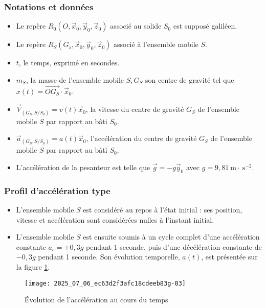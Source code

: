 \subsubsection*{Notations et données}
\begin{itemize}
  \item Le repère $R_{0}\left(O, \vec{x}_{0}, \vec{y}_{0}, \vec{z}_{0}\right)$ associé au solide $S_{0}$ est supposé galiléen.
  \item Le repère $R_{S}\left(G_{s}, \vec{x}_{0}, \vec{y}_{0}, \vec{z}_{0}\right)$ associé à l'ensemble mobile $S$.
  \item $t$, le temps, exprimé en secondes.
  \item $m_{S}$, la masse de l'ensemble mobile $S, G_{S}$ son centre de gravité tel que $x(t)=\overrightarrow{O G_{S}} \cdot \vec{x}_{0}$.
  \item $\vec{V}_{\left(G_{S}, S / S_{0}\right)}=v(t) \vec{x}_{0}$, la vitesse du centre de gravité $G_{S}$ de l'ensemble mobile $S$ par rapport au bâti $S_{0}$.
  \item $\vec{a}_{\left(G_{S}, S / S_{0}\right)}=a(t) \vec{x}_{0}$, l'accélération du centre de gravité $G_{S}$ de l'ensemble mobile $S$ par rapport au bâti $S_{0}$.
  \item L'accélération de la pesanteur est telle que $\vec{g}=-g \vec{y}_{0}$ avec $g=9,81 \mathrm{~m} \cdot \mathrm{~s}^{-2}$.
\end{itemize}

\subsubsection*{Profil d'accélération type}
\begin{itemize}
  \item L'ensemble mobile $S$ est considéré au repos à l'état initial : ses position, vitesse et accélération sont considérées nulles à l'instant initial.
  \item L'ensemble mobile $S$ est ensuite soumis à un cycle complet d'une accélération constante $a_{c}=+0,3 g$ pendant 1 seconde, puis d'une décélération constante de $-0,3 g$ pendant 1 seconde. Son évolution temporelle, $a(t)$, est présentée sur la figure \ref{ccs_mp_2022_fig_04}.
\end{itemize}

\begin{figure}[!h]
\centering
\texttt{[image: 2025\_07\_06\_ec63d2f3afc18cdeeb83g-03]}
\caption{\label{ccs_mp_2022_fig_04}Évolution de l'accélération au cours du temps}
\end{figure}
